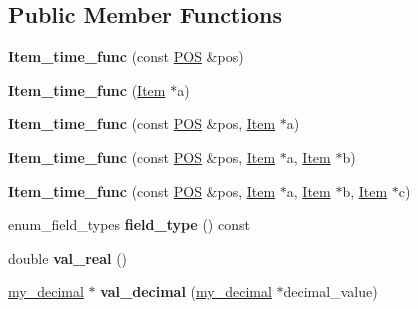 \subsection*{Public Member Functions}
\begin{DoxyCompactItemize}
\item 
\mbox{\label{classItem__time__func_a8ae1188c484aaba50727b2f5994e37a5}} 
{\bfseries Item\+\_\+time\+\_\+func} (const \mbox{\hyperlink{structYYLTYPE}{P\+OS}} \&pos)
\item 
\mbox{\label{classItem__time__func_a78ebea5c33acc12924d1c2affdc1e564}} 
{\bfseries Item\+\_\+time\+\_\+func} (\mbox{\hyperlink{classItem}{Item}} $\ast$a)
\item 
\mbox{\label{classItem__time__func_a6aa68f0127f64074b29619d3ba47a407}} 
{\bfseries Item\+\_\+time\+\_\+func} (const \mbox{\hyperlink{structYYLTYPE}{P\+OS}} \&pos, \mbox{\hyperlink{classItem}{Item}} $\ast$a)
\item 
\mbox{\label{classItem__time__func_aa7286e60015254acf12c535485a74a50}} 
{\bfseries Item\+\_\+time\+\_\+func} (const \mbox{\hyperlink{structYYLTYPE}{P\+OS}} \&pos, \mbox{\hyperlink{classItem}{Item}} $\ast$a, \mbox{\hyperlink{classItem}{Item}} $\ast$b)
\item 
\mbox{\label{classItem__time__func_a70025d68e29ec3ec05d9da8741c1fee0}} 
{\bfseries Item\+\_\+time\+\_\+func} (const \mbox{\hyperlink{structYYLTYPE}{P\+OS}} \&pos, \mbox{\hyperlink{classItem}{Item}} $\ast$a, \mbox{\hyperlink{classItem}{Item}} $\ast$b, \mbox{\hyperlink{classItem}{Item}} $\ast$c)
\item 
\mbox{\label{classItem__time__func_a8153128da8a15967a0966708f1c1fa4b}} 
enum\+\_\+field\+\_\+types {\bfseries field\+\_\+type} () const
\item 
\mbox{\label{classItem__time__func_a9295b226ceec866e77a0199692189d8e}} 
double {\bfseries val\+\_\+real} ()
\item 
\mbox{\label{classItem__time__func_a76912c3f47c507ac5105ad50140b7820}} 
\mbox{\hyperlink{classmy__decimal}{my\+\_\+decimal}} $\ast$ {\bfseries val\+\_\+decimal} (\mbox{\hyperlink{classmy__decimal}{my\+\_\+decimal}} $\ast$decimal\+\_\+value)

\end{DoxyCompactItemize}
